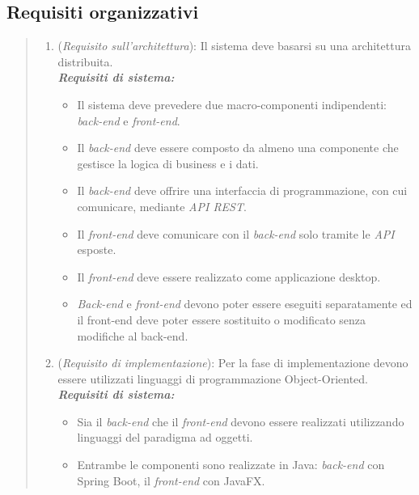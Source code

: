 \subsection{Requisiti organizzativi}

\begin{quote}
\begin{enumerate}[label=\textit{RO\arabic*}]
  \item (\textit{Requisito sull'architettura}): Il sistema deve basarsi su una architettura distribuita. \\
    \textbf{\textit{Requisiti di sistema:}} 
    \begin{itemize}
        \item Il sistema deve prevedere due macro-componenti indipendenti: \textit{back-end} e \textit{front-end}.
        \item Il \textit{back-end} deve essere composto da almeno una componente che gestisce la logica di business e i dati.
        \item Il \textit{back-end} deve offrire una interfaccia di programmazione, con cui comunicare, mediante \textit{API REST}.
        \item Il \textit{front-end} deve comunicare con il \textit{back-end} solo tramite le \textit{API} esposte.
        \item Il \textit{front-end} deve essere realizzato come applicazione desktop.
        \item \textit{Back-end} e \textit{front-end} devono poter essere eseguiti separatamente ed il front-end deve poter essere sostituito o modificato senza modifiche al back-end.
    \end{itemize} 
    
  \item (\textit{Requisito di implementazione}): Per la fase di implementazione devono essere utilizzati linguaggi di programmazione Object-Oriented. \\
  \textbf{\textit{Requisiti di sistema:}} 
    \begin{itemize}
        \item Sia il \textit{back-end} che il \textit{front-end} devono essere realizzati utilizzando linguaggi del paradigma ad oggetti.
        \item Entrambe le componenti sono realizzate in Java: \textit{back-end} con Spring Boot, il \textit{front-end} con JavaFX.
    \end{itemize} 
  

\end{enumerate}
\end{quote}
